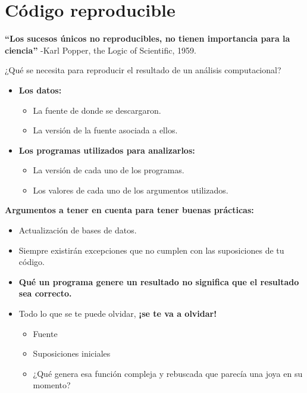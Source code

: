 \documentclass[
]{book}
\providecommand{\tightlist}{%
  \setlength{\itemsep}{0pt}\setlength{\parskip}{0pt}}
\begin{document}
\section{Código reproducible}\label{cuxf3digo-reproducible}

\textbf{``Los sucesos únicos no reproducibles, no tienen importancia para la ciencia''}
-Karl Popper, the Logic of Scientific, 1959.

¿Qué se necesita para reproducir el resultado de un análisis computacional?

\begin{itemize}
\tightlist
\item
  \textbf{Los datos:}

  \begin{itemize}
  \tightlist
  \item
    La fuente de donde se descargaron.
  \item
    La versión de la fuente asociada a ellos.
  \end{itemize}
\item
  \textbf{Los programas utilizados para analizarlos:}

  \begin{itemize}
  \tightlist
  \item
    La versión de cada uno de los programas.
  \item
    Los valores de cada uno de los argumentos utilizados.
  \end{itemize}
\end{itemize}

\textbf{Argumentos a tener en cuenta para tener buenas prácticas:}

\begin{itemize}
\tightlist
\item
  Actualización de bases de datos.
\item
  Siempre existirán excepciones que no cumplen con las suposiciones de tu código.
\item
  \textbf{Qué un programa genere un resultado no significa que el resultado sea correcto.}
\item
  Todo lo que se te puede olvidar, \textbf{¡se te va a olvidar!}

  \begin{itemize}
  \tightlist
  \item
    Fuente
  \item
    Suposiciones iniciales
  \item
    ¿Qué genera esa función compleja y rebuscada que parecía una joya en su momento?
  \end{itemize}
\end{itemize}
\end{document}
